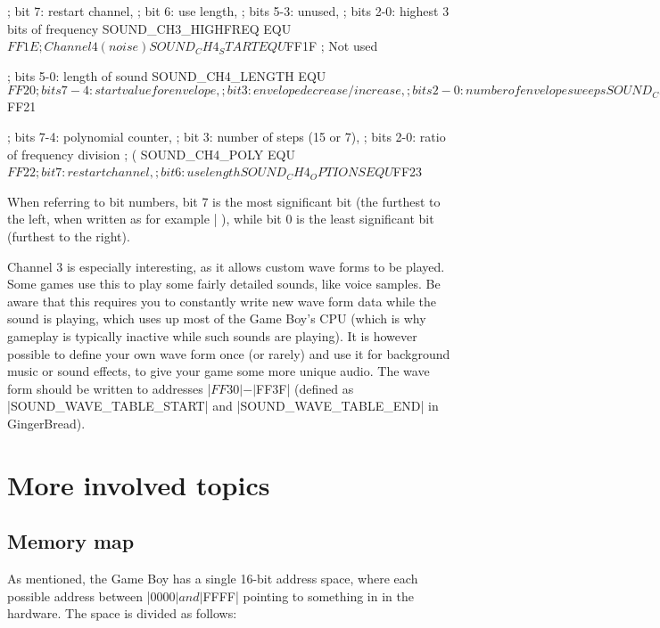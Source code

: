 \documentclass[11pt]{book}
\begin{document}
\begin{code}
; bit 7: restart channel, 
; bit 6: use length,
; bits 5-3: unused,
; bits 2-0: highest 3 bits of frequency
SOUND_CH3_HIGHFREQ  EQU $FF1E 

; Channel 4 (noise)
SOUND_CH4_START     EQU $FF1F ; Not used 

; bits 5-0: length of sound
SOUND_CH4_LENGTH    EQU $FF20

; bits 7-4: start value for envelope,
; bit 3: envelope decrease/increase,
; bits 2-0: number of envelope sweeps
SOUND_CH4_ENVELOPE  EQU $FF21 

; bits 7-4: polynomial counter, 
; bit 3: number of steps (15 or 7), 
; bits 2-0: ratio of frequency division 
; (%
SOUND_CH4_POLY      EQU $FF22 

; bit 7: restart channel,
; bit 6: use length
SOUND_CH4_OPTIONS   EQU $FF23 

\end{code}

When referring to bit numbers, bit 7 is the most significant bit (the furthest to the left, when written as for example |%
), while bit 0 is the least significant bit (furthest to the right).

Channel 3 is especially interesting, as it allows custom wave forms to be played. Some games use this to play some fairly detailed sounds, like voice samples. Be aware that this requires you to constantly write new wave form data while the sound is playing, which uses up most of the Game Boy's CPU (which is why gameplay is typically inactive while such sounds are playing). It is however possible to define your own wave form once (or rarely) and use it for background music or sound effects, to give your game some more unique audio. The wave form should be written to addresses |$FF30|-|$FF3F| (defined as |SOUND_WAVE_TABLE_START| and |SOUND_WAVE_TABLE_END| in GingerBread).

\chapter{More involved topics}

\section{Memory map}
\label{memmap}
As mentioned, the Game Boy has a single 16-bit address space, where each possible address between |$0000| and |$FFFF| pointing to something in in the hardware. The space is divided as follows:
\end{document}
